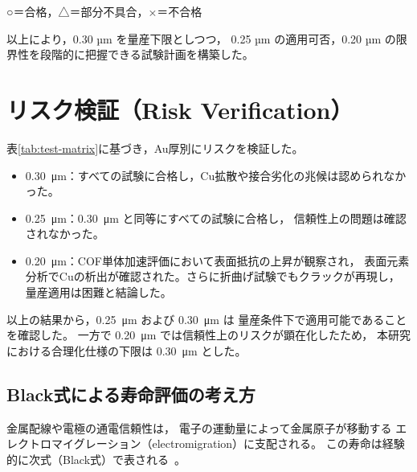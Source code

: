 \documentclass[conference]{IEEEtran}
\begin{document}
\begin{table}[htbp]
  \centering
  \caption{評価試験マトリクス（Evaluation test matrix）}
  \label{tab:test-matrix}
  \vspace{2pt}
  \footnotesize{○＝合格，△＝部分不具合，×＝不合格}
\end{table}

\vspace{2mm}
\noindent
以上により，0.30 µm を量産下限としつつ，
0.25 µm の適用可否，0.20 µm の限界性を段階的に把握できる試験計画を構築した。

\section{リスク検証（Risk Verification）}
表\ref{tab:test-matrix}に基づき，Au厚別にリスクを検証した。
\begin{itemize}
  \item \SI{0.30}{\micro\meter}：すべての試験に合格し，Cu拡散や接合劣化の兆候は認められなかった。
  \item \SI{0.25}{\micro\meter}：\SI{0.30}{\micro\meter} と同等にすべての試験に合格し，
        信頼性上の問題は確認されなかった。
  \item \SI{0.20}{\micro\meter}：COF単体加速評価において表面抵抗の上昇が観察され，
        表面元素分析でCuの析出が確認された。さらに折曲げ試験でもクラックが再現し，
        量産適用は困難と結論した。
\end{itemize}

以上の結果から，\SI{0.25}{\micro\meter} および \SI{0.30}{\micro\meter} は
量産条件下で適用可能であることを確認した。  
一方で \SI{0.20}{\micro\meter} では信頼性上のリスクが顕在化したため，
本研究における合理化仕様の下限は \SI{0.30}{\micro\meter} とした。

\subsection*{Black式による寿命評価の考え方}
金属配線や電極の通電信頼性は，
電子の運動量によって金属原子が移動する
エレクトロマイグレーション（electromigration）に支配される。
この寿命は経験的に次式（Black式）で表される~\cite{Black}。
\end{document}
